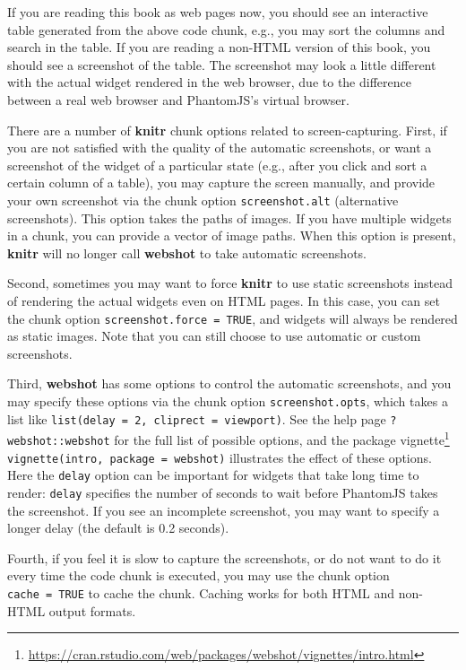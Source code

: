 \documentclass[
  12pt,
]{krantz}
\renewcommand{\href}[2]{#2\footnote{\url{#1}}}
\theoremstyle{definition}
\theoremstyle{definition}
\theoremstyle{definition}
\theoremstyle{definition}
\theoremstyle{remark}
\begin{document}
If you are reading this book as web pages now, you should see an interactive table generated from the above code chunk, e.g., you may sort the columns and search in the table. If you are reading a non-HTML version of this book, you should see a screenshot of the table. The screenshot may look a little different with the actual widget rendered in the web browser, due to the difference between a real web browser and PhantomJS's virtual browser.

There are a number of \textbf{knitr} chunk options related to screen-capturing. First, if you are not satisfied with the quality of the automatic screenshots, or want a screenshot of the widget of a particular state (e.g., after you click and sort a certain column of a table), you may capture the screen manually, and provide your own screenshot via the chunk option \texttt{screenshot.alt} (alternative screenshots). This option takes the paths of images. If you have multiple widgets in a chunk, you can provide a vector of image paths. When this option is present, \textbf{knitr} will no longer call \textbf{webshot} to take automatic screenshots.

Second, sometimes you may want to force \textbf{knitr} to use static screenshots instead of rendering the actual widgets even on HTML pages. In this case, you can set the chunk option \texttt{screenshot.force\ =\ TRUE}, and widgets will always be rendered as static images. Note that you can still choose to use automatic or custom screenshots.

Third, \textbf{webshot} has some options to control the automatic screenshots, and you may specify these options via the chunk option \texttt{screenshot.opts}, which takes a list like \texttt{list(delay\ =\ 2,\ cliprect\ =\ \textquotesingle{}viewport\textquotesingle{})}. See the help page \texttt{?webshot::webshot} for the full list of possible options, and the \href{https://cran.rstudio.com/web/packages/webshot/vignettes/intro.html}{package vignette} \texttt{vignette(\textquotesingle{}intro\textquotesingle{},\ package\ =\ \textquotesingle{}webshot\textquotesingle{})} illustrates the effect of these options. Here the \texttt{delay} option can be important for widgets that take long time to render: \texttt{delay} specifies the number of seconds to wait before PhantomJS takes the screenshot. If you see an incomplete screenshot, you may want to specify a longer delay (the default is 0.2 seconds).

Fourth, if you feel it is slow to capture the screenshots, or do not want to do it every time the code chunk is executed, you may use the chunk option \texttt{cache\ =\ TRUE} to cache the chunk. Caching works for both HTML and non-HTML output formats.
\end{document}
